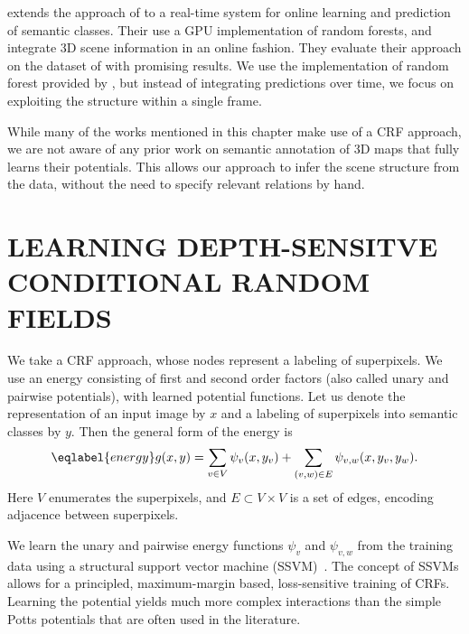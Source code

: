 \documentclass[a4paper, 10pt, conference]{ieeeconf}      %
\begin{document}
\citet{stueckler2013} extends the approach of \citet{stuckler2012semantic} to
a real-time system for online learning and prediction of semantic classes. Their
use a GPU implementation of random forests, and integrate 3D scene information
in an online fashion. They evaluate their approach on the dataset of
\citet{SilbermanECCV12} with promising results.
We use the implementation of random forest provided by
\citet{stueckler2013}, but instead of integrating predictions over time, we
focus on exploiting the structure within a single frame.

While many of the works mentioned in this chapter make use of a CRF
approach, we are not aware of any prior work on semantic annotation of 3D maps
that fully learns their potentials. This allows our approach to infer
the scene structure from the data, without the need to specify relevant relations
by hand.



\section{LEARNING DEPTH-SENSITVE CONDITIONAL RANDOM FIELDS}
We take a CRF approach, whose nodes represent a labeling of
superpixels.  We use an energy consisting of first and second order factors
(also called unary and pairwise potentials), with learned potential functions.
Let us denote the representation of an input image by $x$ and a labeling of
superpixels into semantic classes by $y$.  Then the general form of the energy is
\begin{equation}\eqlabel{energy}
    g(x, y) = \sum_{v \in V} \psi_v(x, y_v) + \sum_{(v, w) \in E} \psi_{v,w}(x, y_{v}, y_{w}).
\end{equation}
Here $V$ enumerates the superpixels, and $E\subset V \times V$ is a set of
edges, encoding adjacence between superpixels.

We learn the unary and pairwise energy functions $\psi_v$ and $\psi_{v, w}$ from the training data
using a structural support vector machine (SSVM)~\citep{joachims2009cutting}. 
The concept of SSVMs allows for a principled,
maximum-margin based, loss-sensitive training of CRFs. Learning the potential yields much
more complex interactions than the simple Potts potentials that are often used in the literature.
\end{document}
